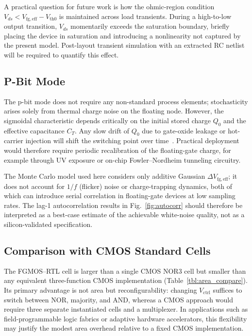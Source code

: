 \documentclass[a4paper,fleqn]{cas-sc}
\newcommand{\Vfgeff}{V_{\mathrm{fg,eff}}}
\newcommand{\Vctrl}{V_{\mathrm{ctrl}}}
\newcommand{\Vth}{V_{\mathrm{th0}}}
\newcommand{\CT}{C_{T}}
\begin{document}
A practical question for future work is how the ohmic-region condition
$V_{ds} < \Vfgeff - \Vth$ is maintained across load transients. During a
high-to-low output transition, $V_{ds}$ momentarily exceeds the saturation boundary,
briefly placing the device in saturation and introducing a nonlinearity not captured
by the present model. Post-layout transient simulation with an extracted RC netlist
will be required to quantify this effect.

\subsection{P-Bit Mode}

The p-bit mode does not require any non-standard process elements; stochasticity arises
solely from thermal charge noise on the floating node. However, the sigmoidal
characteristic depends critically on the initial stored charge $Q_0$ and the effective
capacitance $\CT$. Any slow drift of $Q_0$ due to gate-oxide leakage or hot-carrier
injection will shift the switching point over time~\cite{Landauer1961}. Practical
deployment would therefore require periodic recalibration of the floating-gate charge,
for example through UV exposure or on-chip Fowler--Nordheim tunneling circuitry.

The Monte Carlo model used here considers only additive Gaussian $\Delta\Vfgeff$;
it does not account for $1/f$ (flicker) noise or charge-trapping dynamics, both of
which can introduce serial correlation in floating-gate devices at low sampling
rates. The lag-1 autocorrelation results in Fig.~\ref{fig:autocorr} should therefore
be interpreted as a best-case estimate of the achievable white-noise quality, not as
a silicon-validated specification.

\subsection{Comparison with CMOS Standard Cells}

The FGMOS--RTL cell is larger than a single CMOS NOR3 cell but smaller than any
equivalent three-function CMOS implementation (Table~\ref{tbl:area_compare}). Its
primary advantage is not area but reconfigurability: changing $\Vctrl$ suffices to
switch between NOR, majority, and AND, whereas a CMOS approach would require three
separate instantiated cells and a multiplexer. In applications such as
field-programmable logic fabrics or adaptive hardware accelerators, this flexibility
may justify the modest area overhead relative to a fixed CMOS implementation.
\end{document}
